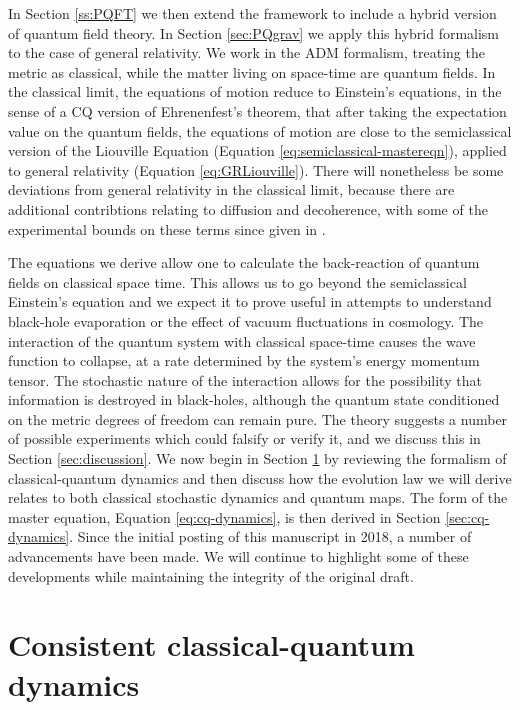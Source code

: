 \documentclass[aps,pra,showpacs,citeautoscript,amsmath,amssymb,floatfix,superscriptaddress,bbm, verbatim,amsfonts,changes,10pt,nofootinbib,longbibliography]{revtex4-1}
\begin{document}
In Section \ref{ss:PQFT} we then extend the framework to include a hybrid version of quantum field theory. In Section \ref{sec:PQgrav} we apply this hybrid formalism to the case of general relativity. We work in the ADM formalism\cite{arnowitt2008republication}, treating the metric as classical, while the matter living on space-time are quantum fields. %
	In the classical limit, the  equations of motion reduce to Einstein's equations, in the sense of a CQ version of Ehrenenfest's theorem, that after taking the expectation value on the quantum fields, the equations of motion are close to the semiclassical version of the Liouville Equation (Equation \eqref{eq:semiclassical-mastereqn}), applied to general relativity (Equation \eqref{eq:GRLiouville}).
There will nonetheless be some deviations from general relativity in the classical limit, because there are additional contribtions relating to diffusion and decoherence, with some of the experimental bounds on these terms since given in \cite{oppenheim2021gravitationally}.
\label{par:Climit}

The equations we derive allow one to calculate the back-reaction of quantum fields on classical space time. This allows us to go beyond the semiclassical Einstein's equation and we expect it to prove useful in attempts to understand black-hole evaporation or the effect of vacuum fluctuations in cosmology.
 The interaction of the quantum system with classical space-time causes the wave function to collapse, at a rate determined by the system's energy momentum tensor. The stochastic nature of the interaction allows for the possibility that information is destroyed in black-holes, although the quantum state conditioned on the metric degrees of freedom can remain pure. The theory suggests a number of possible experiments which could falsify or verify it, and we discuss this in Section \ref{sec:discussion}.
We now begin in Section \ref{sec:cq-review} by reviewing the formalism of classical-quantum dynamics and then discuss how the evolution law we will derive relates to both classical stochastic dynamics and quantum maps. The form of the master equation, Equation \eqref{eq:cq-dynamics}, is then derived in Section \ref{sec:cq-dynamics}. 
Since the initial posting of this manuscript in 2018\cite{oppenheim2018postArxiv}, a number of advancements have been made. We will continue to highlight some of these developments while maintaining the integrity of the original draft.



 
\section{Consistent classical-quantum dynamics}
\label{sec:cq-review}
\end{document}
